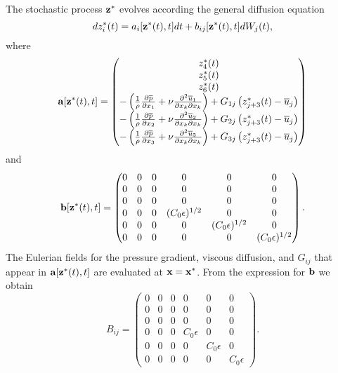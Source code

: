 \documentclass[oneside,a4paper,11pt]{report}
\newcommand{\pavg}{\overline{p}}
\newcommand{\uavg}{\overline{u}}
\begin{document}
The stochastic process $\mathbf{z}^*$ evolves according the general diffusion equation
\begin{equation}
dz^*_i(t) = a_i[\mathbf{z}^*(t),t] dt + b_{ij}[\mathbf{z}^*(t),t] dW_j(t),
\end{equation}
where 
\begin{equation}
\avec[\zvec^*(t),t] =  \begin{pmatrix}
  z^*_4(t) \\
  z^*_5(t)  \\
  z^*_6(t) \\
-\left ( \frac{1}{\rho} \frac{\partial \pavg}{\partial x_1} + \nu \frac{\partial^2 \uavg_1}{\partial x_k \partial x_k} \right ) + G_{1j} \left ( z_{j+3}^*(t) - \uavg_j \right ) \\
-\left ( \frac{1}{\rho} \frac{\partial \pavg}{\partial x_2} + \nu \frac{\partial^2 \uavg_2}{\partial x_k \partial x_k} \right ) + G_{2j} \left ( z_{j+3}^*(t) - \uavg_j \right ) \\
-\left ( \frac{1}{\rho} \frac{\partial \pavg}{\partial x_3} + \nu \frac{\partial^2 \uavg_3}{\partial x_k \partial x_k} \right ) + G_{3j} \left ( z_{j+3}^*(t) - \uavg_j \right )
 \end{pmatrix}
\end{equation}
and
\begin{equation}
\mathbf{b}[\mathbf{z}^*(t),t] = \begin{pmatrix}
  0 & 0 & 0 & 0 & 0 & 0 \\
  0 & 0 & 0 & 0 & 0 & 0 \\
  0 & 0 & 0 & 0 & 0 & 0 \\
  0 & 0 & 0 & (C_0 \epsilon)^{1/2}  & 0 & 0 \\
  0 & 0 & 0 & 0 & (C_0 \epsilon)^{1/2}  & 0 \\
  0 & 0 & 0 & 0 & 0 & (C_0 \epsilon)^{1/2} 
 \end{pmatrix}.
\end{equation}
The Eulerian fields for the pressure gradient, viscous diffusion, and $G_{ij}$ that appear in $\mathbf{a}[\mathbf{z}^*(t),t]$ are evaluated at $\mathbf{x} = \mathbf{x}^*$. From the expression for $\mathbf{b}$ we obtain
\begin{equation}
B_{ij} = \begin{pmatrix}
  0 & 0 & 0 & 0 & 0 & 0 \\
  0 & 0 & 0 & 0 & 0 & 0 \\
  0 & 0 & 0 & 0 & 0 & 0 \\
  0 & 0 & 0 & C_0 \epsilon  & 0 & 0 \\
  0 & 0 & 0 & 0 & C_0 \epsilon  & 0 \\
  0 & 0 & 0 & 0 & 0 & C_0 \epsilon
 \end{pmatrix}.
\end{equation}
\end{document}
